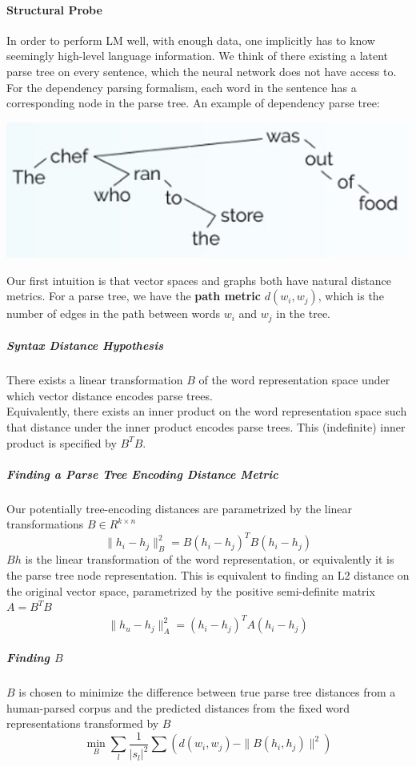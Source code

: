 \documentclass[10pt]{report}
\begin{document}
\paragraph{Structural Probe} In order to perform LM well, with enough data, one implicitly has to know seemingly high-level language information. We think of there existing a latent parse tree on every sentence, which the neural network does not have access to. For the dependency parsing formalism, each word in the sentence has a corresponding node in the parse tree. An example of dependency parse tree:
\begin{center}
	\includegraphics[scale=0.5]{82.png}
\end{center}
Our first intuition is that vector spaces and graphs both have natural distance metrics. For a parse tree, we have the \textbf{path metric} $d(w_i, w_j)$, which is the number of edges in the path between words $w_i$ and $w_j$ in the tree.
\subparagraph{Syntax Distance Hypothesis} There exists a linear transformation $B$ of the word representation space under which vector distance encodes parse trees.\\
Equivalently, there exists an inner product on the word representation space such that distance under the inner product encodes parse trees. This (indefinite) inner product is specified by $B^TB$.
\subparagraph{Finding a Parse Tree Encoding Distance Metric} Our potentially tree-encoding distances are parametrized by the linear transformations $B\in R^{k\times n}$
$$\|h_i-h_j\|^2_B = B(h_i-h_j)^TB(h_i-h_j)$$
$Bh$ is the linear transformation of the word representation, or equivalently it is the parse tree node representation. This is equivalent to finding an L2 distance on the original vector space, parametrized by the positive semi-definite matrix $A=B^TB$
$$\|h_u-h_j\|^2_A = (h_i-h_j)^TA(h_i-h_j)$$
\subparagraph{Finding $B$} $B$ is chosen to minimize the difference between true parse tree distances from a human-parsed corpus and the predicted distances from the fixed word representations transformed by $B$
$$\min_B\sum_l\frac{1}{|s_l|^2}\sum\left(d(w_i,w_j)-\|B(h_i,h_j)\|^2\right)$$
\end{document}
